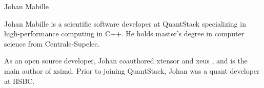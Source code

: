 \begin{participant}[type=R,PM=0,gender=male]{Johan Mabille}


  \par Johan Mabille is a scientific software developer at QuantStack specializing in high-performance computing in C++. He holds master's degree in computer science from Centrale-Supelec.

  \par As an open source developer, Johan coauthored xtensor and xeus , and is the main author of xsimd. Prior to joining QuantStack, Johan was a quant developer at HSBC.

\end{participant}

